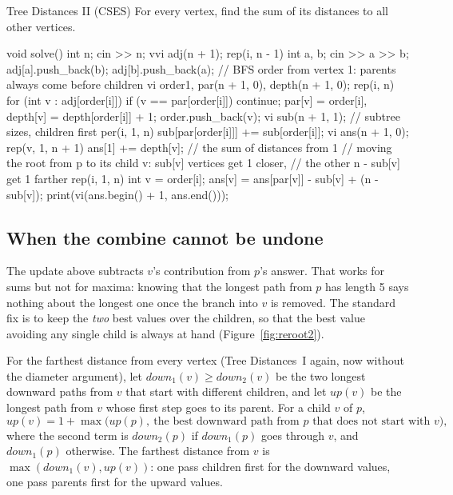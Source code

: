 \begin{problem}{Tree Distances II (CSES)}
For every vertex, find the sum of its distances to all other vertices.
\end{problem}

\begin{code}
void solve() {
    int n;
    cin >> n;
    vvi adj(n + 1);
    rep(i, n - 1) {
        int a, b;
        cin >> a >> b;
        adj[a].push_back(b);
        adj[b].push_back(a);
    }
    // BFS order from vertex 1: parents always come before children
    vi order{1}, par(n + 1, 0), depth(n + 1, 0);
    rep(i, n) for (int v : adj[order[i]]) {
        if (v == par[order[i]]) continue;
        par[v] = order[i], depth[v] = depth[order[i]] + 1;
        order.push_back(v);
    }
    vi sub(n + 1, 1);  // subtree sizes, children first
    per(i, 1, n) sub[par[order[i]]] += sub[order[i]];
    vi ans(n + 1, 0);
    rep(v, 1, n + 1) ans[1] += depth[v];  // the sum of distances from 1
    // moving the root from p to its child v: sub[v] vertices get 1 closer,
    // the other n - sub[v] get 1 farther
    rep(i, 1, n) {
        int v = order[i];
        ans[v] = ans[par[v]] - sub[v] + (n - sub[v]);
    }
    print(vi(ans.begin() + 1, ans.end()));
}
\end{code}


\subsection{When the combine cannot be undone}

The update above subtracts $v$'s contribution from $p$'s answer. That works for sums but not for maxima: knowing that the longest
path from $p$ has length 5 says nothing about the longest one once the branch into $v$ is removed. The standard fix is to keep the
\emph{two} best values over the children, so that the best value avoiding any single child is always at hand
(Figure~\ref{fig:reroot2}).

For the farthest distance from every vertex (Tree Distances~I again, now without the diameter argument), let
$\mathit{down}_1(v) \ge \mathit{down}_2(v)$ be the two longest downward paths from $v$ that start with different children, and let
$\mathit{up}(v)$ be the longest path from $v$ whose first step goes to its parent. For a child $v$ of $p$,
\[
  \mathit{up}(v) = 1 + \max\bigl(\mathit{up}(p),\ \text{the best downward path from $p$ that does not start with $v$}\bigr),
\]
where the second term is $\mathit{down}_2(p)$ if $\mathit{down}_1(p)$ goes through $v$, and $\mathit{down}_1(p)$ otherwise. The
farthest distance from $v$ is $\max(\mathit{down}_1(v), \mathit{up}(v))$: one pass children first for the downward values, one pass
parents first for the upward values.

